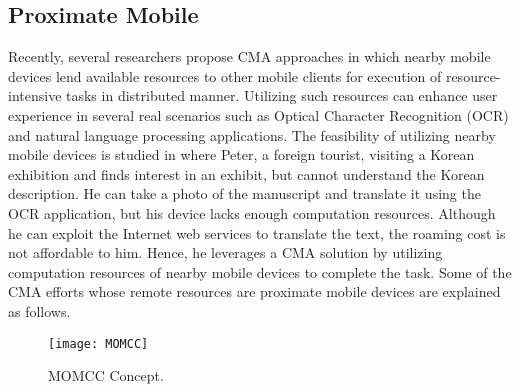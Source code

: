 \documentclass[publish]{IEEEtran}
\begin{document}
\subsection{Proximate Mobile}
Recently, several researchers \cite{hyrax, ChongleiMei2011, MOMCC, Gao2012, Mei2012, Huerta-Canepa,Guirguis2011} propose CMA approaches in which nearby mobile devices lend available resources to other mobile clients for execution of resource-intensive tasks in distributed manner. Utilizing such resources can enhance user experience in several real scenarios such as Optical Character Recognition (OCR) and natural language processing applications. The feasibility of utilizing nearby mobile devices is studied in \cite{Huerta-Canepa} where Peter, a foreign tourist, visiting a Korean exhibition and finds interest in an exhibit, but cannot understand the Korean description. He can take a photo of the manuscript and translate it using the OCR application, but his device lacks enough computation resources. Although he can exploit the Internet web services to translate the text, the roaming cost is not affordable to him. Hence, he leverages a CMA solution by utilizing computation resources of nearby mobile devices to complete the task. Some of the CMA efforts whose remote resources are proximate mobile devices are explained as follows.
\begin{figure*} [t]
\centering
\texttt{[image: MOMCC]}
\caption{MOMCC Concept.} \label{MOMCC}
\end{figure*}
\end{document}

